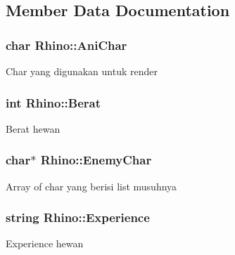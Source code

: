 \subsection{Member Data Documentation}
\subsubsection[{\texorpdfstring{Ani\+Char}{AniChar}}]{\setlength{\rightskip}{0pt plus 5cm}char Rhino\+::\+Ani\+Char\hspace{0.3cm}{\ttfamily [protected]}}\hypertarget{class_rhino_a2784afe60a873a82ab7b8589879ef0da}{}\label{class_rhino_a2784afe60a873a82ab7b8589879ef0da}
Char yang digunakan untuk render 
\subsubsection[{\texorpdfstring{Berat}{Berat}}]{\setlength{\rightskip}{0pt plus 5cm}int Rhino\+::\+Berat\hspace{0.3cm}{\ttfamily [protected]}}\hypertarget{class_rhino_ac06d9f600a60ae1dfe379f180628108e}{}\label{class_rhino_ac06d9f600a60ae1dfe379f180628108e}
Berat hewan 
\subsubsection[{\texorpdfstring{Enemy\+Char}{EnemyChar}}]{\setlength{\rightskip}{0pt plus 5cm}char$\ast$ Rhino\+::\+Enemy\+Char\hspace{0.3cm}{\ttfamily [protected]}}\hypertarget{class_rhino_a7d5163bf655c96d96a5ac470123ebdbf}{}\label{class_rhino_a7d5163bf655c96d96a5ac470123ebdbf}
Array of char yang berisi list musuhnya 
\subsubsection[{\texorpdfstring{Experience}{Experience}}]{\setlength{\rightskip}{0pt plus 5cm}string Rhino\+::\+Experience\hspace{0.3cm}{\ttfamily [protected]}}\hypertarget{class_rhino_ad94f8ff397bf71bcc2904d45e8867ebc}{}\label{class_rhino_ad94f8ff397bf71bcc2904d45e8867ebc}
Experience hewan 
